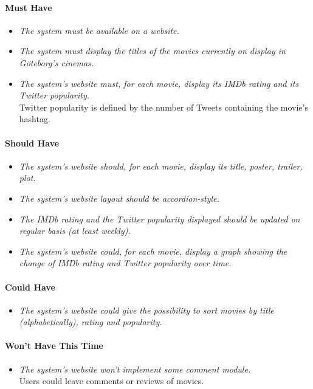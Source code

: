 \documentclass{article}
\begin{document}
\paragraph{Must Have}
\begin{itemize}
\item \textit{The system must be available on a website.}
\item \textit{The system must display the titles of the movies currently on display in Göteborg's cinemas.}
\item \textit{The system's website must, for each movie, display its IMDb rating and its Twitter popularity.}\\ Twitter popularity is defined by the number of Tweets containing the movie's hashtag.
\end{itemize}

\paragraph{Should Have}
\begin{itemize}
\item \textit{The system's website should, for each movie, display its title, poster, trailer, plot.}
\item \textit{The system's website layout should be accordion-style.}
\item \textit{The IMDb rating and the Twitter popularity displayed should be updated on regular basis (at least weekly).}
\item \textit{The system's website could, for each movie, display a graph showing the change of IMDb rating and Twitter popularity over time.}
\end{itemize}

\paragraph{Could Have}
\begin{itemize}
\item \textit{The system's website could give the possibility to sort movies by title (alphabetically), rating and popularity.}
\end{itemize}

\paragraph{Won't Have This Time}
\begin{itemize}
\item \textit{The system's website won't implement some comment module.}\\
Users could leave comments or reviews of movies.
\end{itemize}
\end{document}
